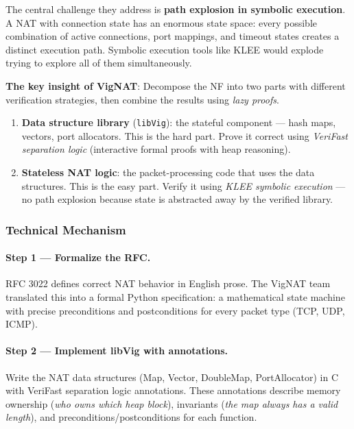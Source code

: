 The central challenge they address is \textbf{path explosion in symbolic execution}. A NAT with connection state has an enormous state space: every possible combination of active connections, port mappings, and timeout states creates a distinct execution path. Symbolic execution tools like KLEE would explode trying to explore all of them simultaneously.

\begin{insightbox}
\textbf{The key insight of VigNAT}: Decompose the NF into two parts with different verification strategies, then combine the results using \emph{lazy proofs}.
\begin{enumerate}
  \item \textbf{Data structure library} (\texttt{libVig}): the stateful component --- hash maps, vectors, port allocators. This is the hard part. Prove it correct using \emph{VeriFast separation logic} (interactive formal proofs with heap reasoning).
  \item \textbf{Stateless NAT logic}: the packet-processing code that uses the data structures. This is the easy part. Verify it using \emph{KLEE symbolic execution} --- no path explosion because state is abstracted away by the verified library.
\end{enumerate}
\end{insightbox}

\subsubsection{Technical Mechanism}

\paragraph{Step 1 --- Formalize the RFC.}
RFC 3022 defines correct NAT behavior in English prose. The VigNAT team translated this into a formal Python specification: a mathematical state machine with precise preconditions and postconditions for every packet type (TCP, UDP, ICMP).

\paragraph{Step 2 --- Implement libVig with annotations.}
Write the NAT data structures (Map, Vector, DoubleMap, PortAllocator) in C with VeriFast separation logic annotations. These annotations describe memory ownership (\emph{who owns which heap block}), invariants (\emph{the map always has a valid length}), and preconditions/postconditions for each function.

